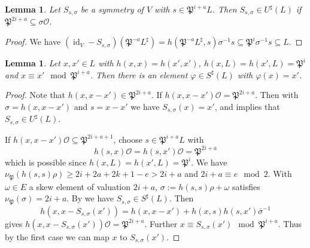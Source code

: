 \documentclass[a4paper]{amsart}
\theoremstyle{definition}
\theoremstyle{plain}
\newtheorem{lemma}[definition]{Lemma}
\DeclareMathOperator{\id}{id}
\renewcommand{\O}{\mathcal{O}}
\newcommand{\FP}{\mathfrak{P}}
\newcommand{\sprod}[2]{h( #1, #2)}
\newcommand{\sprodq}[2]{h( #1,#1)}
\begin{document}
\begin{lemma}\label{lem:refl-ker}
  Let $S_{s, \sigma}$ be a symmetry of $V$ with $s \in \FP^{i+a} L$. Then $S_{s, \sigma}
  \in U^\sharp(L)$ if $\FP^{2i+a} \subseteq \sigma \O$.
\end{lemma}
\begin{proof}
  We have  $(\id_V-S_{s,\sigma})(\FP^{-a}L^\sharp) = \sprod{\FP^{-a}L^\sharp}{s}\sigma^{-1}s \subseteq \FP^{i} \sigma^{-1} s \subseteq L$.
\end{proof}

%
%
%
%
%
%
%
%
%
%
%
%
%
%
%
%
%
%
%
%
%
%
%
%
%
%
%
%
%
%
%
%
%
%
%
%
%
%
%
%
%
%
%
%
%
%
%
%
%
%
%
%
%
%
%
%
%
%
%
%
%
%
%
%
%
%
%
%
%
%
%
%
%
%
%
%
%
%
%
%
%
%


\begin{lemma}\label{line}
 Let $x, x' \in L$ with $\sprodq{x}{x}=\sprodq{x'}{x'}$,
 $\sprod{x}{L}=\sprod{x'}{L}=\FP^i$ and $x \equiv x' \mod \FP^{i+a}$.
  Then there is an element $\varphi \in S^\sharp(L)$ with $\varphi(x) = x'$.
\end{lemma}
\begin{proof}
 Note that $\sprod{x}{x-x'} \in \FP^{2i+a}$.
  If $\sprod{x}{x-x'}\O =\FP^{2i+a}$. Then with $\sigma = \sprod{x}{x-x'}$ and $s = x - x'$ we have $S_{s, \sigma}(x) = x'$, and  implies that 
  $S_{s,\sigma} \in U^\sharp(L)$.

 If $\sprod{x}{x-x'}\O \subseteq \FP^{2i+a+1}$,
 choose $s \in \FP^{i+a}L$ with
 \[\sprod{s}{x}\O = \sprod{s}{x'}\O = \FP^{2i+a} \]
 which is possible since $\sprod{x}{L}=\sprod{x'}{L}=\FP^i$.
 We have $\nu_\FP(\sprodq s s \rho)\geq 2i+2a+2k+1-e > 2i + a$ and $2i+a \equiv e \mod 2$.
 With $\omega \in E$ a skew element of valuation $2i+a$, $\sigma := \sprodq{s}{s}\rho + \omega$ satisfies $\nu_\FP(\sigma)=2i+a$.
 By  we have
 $S_{s,\sigma} \in S^\sharp(L)$.
  Then \[\sprod{x}{x - S_{s,\sigma}(x')}=\sprod{x}{x-x'} + \sprod{x}{s}\sprod{s}{x'}\bar \sigma^{-1}\]
  gives $\sprod{x}{x - S_{s,\sigma}(x')}\O = \FP^{2i+a}$. Further $x \equiv S_{s,\sigma}(x') \mod \FP^{i+a}$. Thus by the first case we can map $x$ to $S_{s,\sigma}(x')$.
\end{proof}
\end{document}
